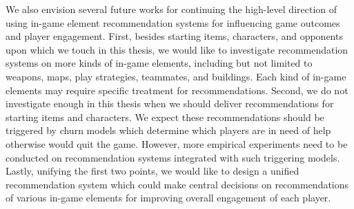 We also envision several future works for continuing the high-level direction of using in-game element recommendation systems for influencing game outcomes and player engagement. First, besides starting items, characters, and opponents upon which we touch in this thesis, we would like to investigate recommendation systems on more kinds of in-game elements, including but not limited to weapons, maps, play strategies, teammates, and buildings. Each kind of in-game elements may require specific treatment for recommendations. Second, we do not investigate enough in this thesis when we should deliver recommendations for starting items and characters. We expect these recommendations should be triggered by churn models which determine which players are in need of help otherwise would quit the game. However, more empirical experiments need to be conducted on recommendation systems integrated with such triggering models. Lastly, unifying the first two points, we would like to design a unified recommendation system which could make central decisions on recommendations of various in-game elements for improving overall engagement of each player. 

